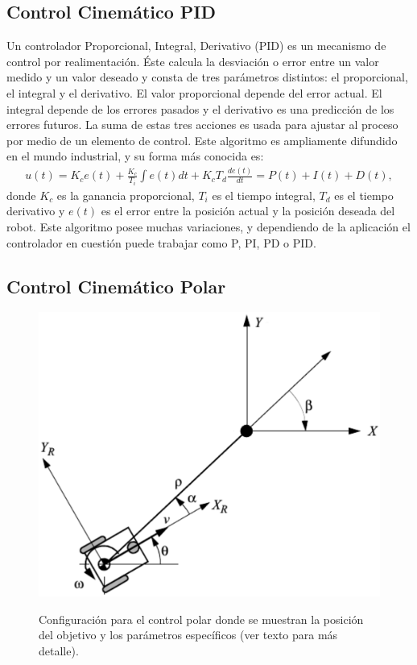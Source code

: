 \subsection{Control Cinemático PID}

Un controlador Proporcional, Integral, Derivativo (PID) es un mecanismo de control 
por realimentación. Éste calcula la desviación o error entre un valor medido y 
un valor deseado y consta de tres parámetros distintos: el 
proporcional, el integral y el derivativo. El valor proporcional depende del error 
actual. El integral depende de los errores pasados y el derivativo es una predicción 
de los errores futuros. La suma de estas tres acciones es usada para ajustar al 
proceso por medio de un elemento de control. Este algoritmo es ampliamente 
difundido en el mundo industrial, y su forma más conocida es:
\begin{align*}
u(t) = K_c e(t) + \frac{K_c}{T_i} \int e(t)dt + K_c T_d \frac{de(t)}{dt} = P(t) + I(t) + D(t),
\end{align*}
donde $K_c$ es la ganancia proporcional, $T_i$ es el tiempo integral, $T_d$ es 
el tiempo derivativo y $e(t)$ es el error entre la posición actual y la posición 
deseada del robot. Este algoritmo posee muchas variaciones, y dependiendo de la 
aplicación el controlador en cuestión puede trabajar como P, PI, PD o PID.

\subsection{Control Cinem\'atico Polar}
\label{sec:ControlPolar}
\begin{figure}%
\centering \footnotesize
 {\includegraphics[width=0.70\linewidth]{images/control_polar.eps}}
 \captionsetup{font=footnotesize}
 \caption[Configuración para el control polar donde se muestran la posición del 
 objetivo y los parámetros específicos(ver texto para
 más detalle).]{Configuración para el control polar donde se muestran la posición del 
 objetivo y los parámetros específicos \cite{siegwart2011introduction} (ver texto para
 más detalle).}
\label{f:controlPolar}
\end{figure}

